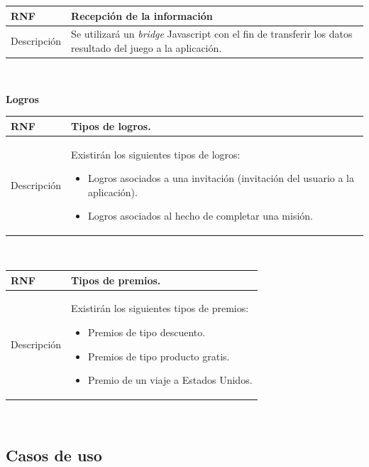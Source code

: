 \documentclass[twoside]{report}
\newcommand\addrow[2]{#1 &#2\\ }
\newcommand\addheading[2]{#1 &#2\\ \hline}
\newcommand\tabularhead{\begin{tabular}{lp{0.7\textwidth}}
\hline
}
\newenvironment{req}{\tabularhead}
{\hline\end{tabular}}
\begin{document}
\vspace{0.25cm}

\begin{req}
	\addheading{\textbf{RNF\arabic{nonFunctionalRequirements}}}{Recepción de la información}
	\addrow{Descripción}{Se utilizará un \textit{bridge} Javascript con el fin de transferir los datos resultado del juego a la aplicación.}
\end{req}\\

\vspace{1cm}

\textbf{Logros}\\

\begin{req}
	\addheading{\textbf{RNF\arabic{nonFunctionalRequirements}}}{Tipos de logros.}
	\addrow{Descripción}{Existirán los siguientes tipos de logros:
	\begin{itemize}
	\item Logros asociados a una invitación (invitación del usuario a la aplicación).
	\item Logros asociados al hecho de completar una misión.
	\end{itemize}}
\end{req}\\

\vspace{0.25cm}

\begin{req}
	\addheading{\textbf{RNF\arabic{nonFunctionalRequirements}}}{Tipos de premios.}
	\addrow{Descripción}{Existirán los siguientes tipos de premios:
	\begin{itemize}
	\item Premios de tipo descuento.
	\item Premios de tipo producto gratis.
	\item Premio de un viaje a Estados Unidos.
	\end{itemize}}
\end{req}\\

\vspace{1cm}

\subsection{Casos de uso}
\end{document}
